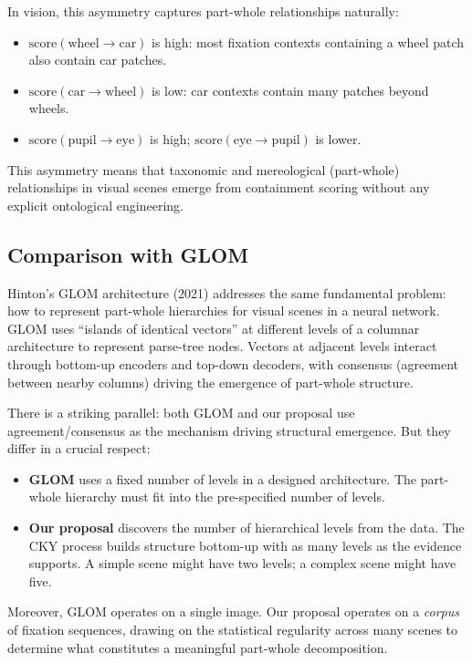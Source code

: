 \documentclass[11pt,a4paper]{article}
\begin{document}
In vision, this asymmetry captures part-whole relationships naturally:

\begin{itemize}
    \item $\text{score}(\text{wheel} \to \text{car})$ is high: most fixation contexts containing a wheel patch also contain car patches.
    \item $\text{score}(\text{car} \to \text{wheel})$ is low: car contexts contain many patches beyond wheels.
    \item $\text{score}(\text{pupil} \to \text{eye})$ is high; $\text{score}(\text{eye} \to \text{pupil})$ is lower.
\end{itemize}

This asymmetry means that taxonomic and mereological (part-whole) relationships in visual scenes emerge from containment scoring without any explicit ontological engineering.

\subsection{Comparison with GLOM}

Hinton's GLOM architecture (2021) addresses the same fundamental problem: how to represent part-whole hierarchies for visual scenes in a neural network. GLOM uses ``islands of identical vectors'' at different levels of a columnar architecture to represent parse-tree nodes. Vectors at adjacent levels interact through bottom-up encoders and top-down decoders, with consensus (agreement between nearby columns) driving the emergence of part-whole structure.

There is a striking parallel: both GLOM and our proposal use agreement/consensus as the mechanism driving structural emergence. But they differ in a crucial respect:

\begin{itemize}
    \item \textbf{GLOM} uses a fixed number of levels in a designed architecture. The part-whole hierarchy must fit into the pre-specified number of levels.
    \item \textbf{Our proposal} discovers the number of hierarchical levels from the data. The CKY process builds structure bottom-up with as many levels as the evidence supports. A simple scene might have two levels; a complex scene might have five.
\end{itemize}

Moreover, GLOM operates on a single image. Our proposal operates on a \textit{corpus} of fixation sequences, drawing on the statistical regularity across many scenes to determine what constitutes a meaningful part-whole decomposition.
\end{document}

